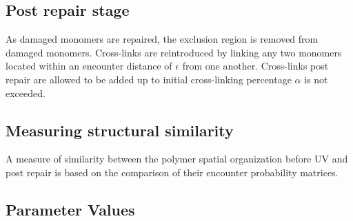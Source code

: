 \documentclass[12pt]{article}
\begin{document}
	\subsection{Post repair stage}
	
	As damaged monomers are repaired, the exclusion region is removed from damaged monomers. Cross-links are reintroduced by linking any two monomers located within an encounter distance of $\epsilon$ from one another. Cross-links post repair are allowed to be added up to initial cross-linking percentage $\alpha$ is not exceeded.
	
	\subsection{Measuring structural similarity}
	A measure of similarity between the polymer spatial organization before UV and post repair is based on the comparison of their encounter probability matrices.
	
	
	\subsection{Parameter Values}
	
	
\end{document}
